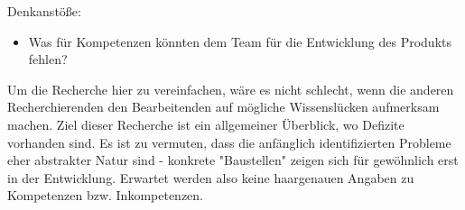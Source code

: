 Denkanstöße:
\begin{itemize}
\item Was für Kompetenzen könnten dem Team für die Entwicklung des Produkts fehlen?
\end{itemize}
Um die Recherche hier zu vereinfachen, wäre es nicht schlecht, wenn die anderen Recherchierenden den Bearbeitenden auf mögliche Wissenslücken aufmerksam machen. Ziel dieser Recherche ist ein allgemeiner Überblick, wo Defizite vorhanden sind. Es ist zu vermuten, dass die anfänglich identifizierten Probleme eher abstrakter Natur sind - konkrete "Baustellen" zeigen sich für gewöhnlich erst in der Entwicklung. Erwartet werden also keine haargenauen Angaben zu Kompetenzen bzw. Inkompetenzen.
\nsecend